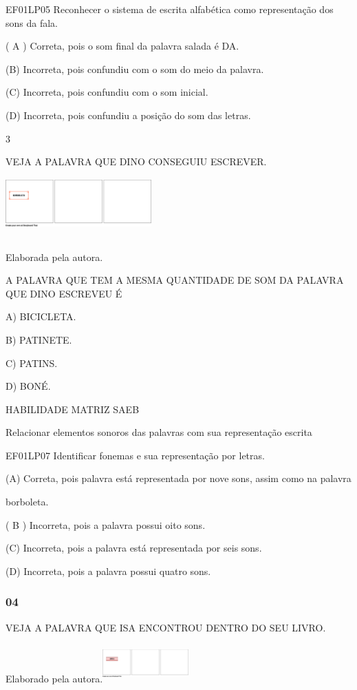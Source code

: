\begin{escola}
EF01LP05 Reconhecer o sistema de escrita alfabética como representação
dos sons da fala.

( A ) Correta, pois o som final da palavra salada é DA.

(B) Incorreta, pois confundiu com o som do meio da palavra.

(C) Incorreta, pois confundiu com o som inicial.

(D) Incorreta, pois confundiu a posição do som das
letras.\protect\hypertarget{_heading=h.ebpkik53igmj}{}{}

\num{3}

VEJA A PALAVRA QUE DINO CONSEGUIU
ESCREVER.\includegraphics[width=2.21250in,height=1.04375in]{media/image243.png}

Elaborada pela autora.

A PALAVRA QUE TEM A MESMA QUANTIDADE DE SOM DA PALAVRA QUE DINO ESCREVEU
É

A) BICICLETA.

B) PATINETE.

C) PATINS.

D) BONÉ.

HABILIDADE MATRIZ SAEB

Relacionar elementos sonoros das palavras com sua representação escrita

EF01LP07 Identificar fonemas e sua representação por letras.

(A) Correta, pois palavra está representada por nove sons, assim como na
palavra

borboleta.

( B ) Incorreta, pois a palavra possui oito sons.

(C) Incorreta, pois a palavra está representada por seis sons.

(D) Incorreta, pois a palavra possui quatro sons.

\subsubsection{04}\label{section-76}

VEJA A PALAVRA QUE ISA ENCONTROU DENTRO DO SEU LIVRO.

Elaborado pela
autora.\includegraphics[width=1.29722in,height=0.57917in]{media/image244.png}


\end{escola}
